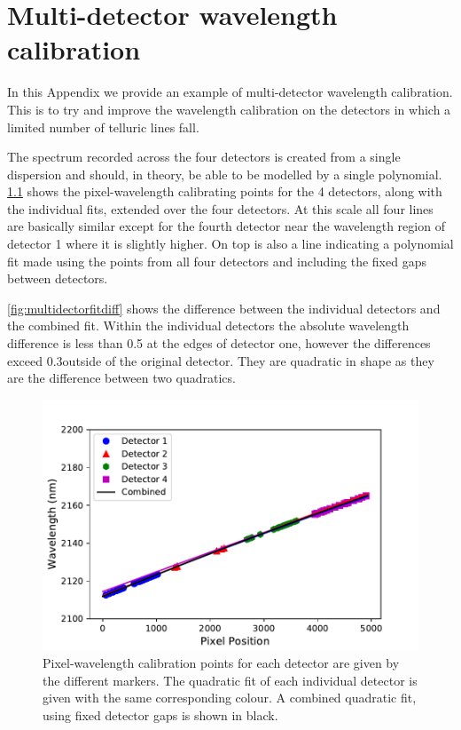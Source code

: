 
\chapter{Multi-detector wavelength calibration} %
\label{appendix:wavelength_fitting}

In this Appendix we provide an example of multi-detector wavelength calibration.
This is to try and improve the wavelength calibration on the detectors in which a limited number of telluric lines fall.

The spectrum recorded across the four detectors is created from a single dispersion and should, in theory, be able to be modelled by a single polynomial. \cref{fig:multidectorfit} shows the pixel-wavelength calibrating points for the 4 detectors, along with the individual fits, extended over the four detectors. At this scale all four lines are basically similar except for the fourth detector near  the wavelength region of detector 1 where it is slightly higher. On top is also a line indicating a polynomial fit made using the points from all four detectors and including the fixed gaps between detectors. 

\cref{fig:multidectorfitdiff} shows the difference between the individual detectors and the combined fit. Within the individual detectors the absolute wavelength difference is less than 0.5\nm{} at the edges of detector one, however the differences exceed 0.3\nm outside of the original detector. They are quadratic in shape as they are the difference between two quadratics.

\begin{figure}
    \centering
    \includegraphics[width=0.75\linewidth]{./figures/appendix/combined_wav_fit}
    \caption[Multi-detector fit and difference to individual fits.]{Pixel-wavelength calibration points for each detector are given by the different markers. The quadratic fit of each individual detector is given with the same corresponding colour. A combined quadratic fit, using fixed detector gaps is shown in black.}
    \label{fig:multidectorfit}
\end{figure}



